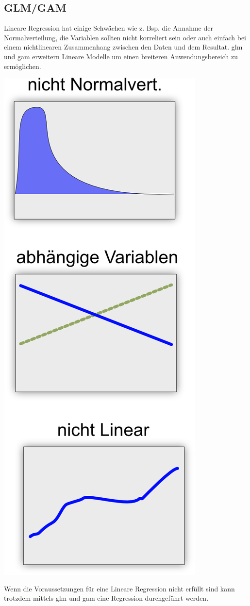 \documentclass[
  12pt, %
  a4paper, %
  oneside, %
  openany, 
  numbers=noenddot, %
  BCOR=5mm, %
  parskip=half*, %
  thesis, %
]{bfhbook}
\begin{document}
\subsection{GLM/GAM}
\label{gam}
Lineare Regression hat einige Schwächen wie z. Bsp. die Annahme der Normalverteilung, die Variablen sollten nicht korreliert sein oder auch einfach bei einem nichtlinearen Zusammenhang zwischen den Daten und dem Resultat. \acrfull{glm} und \acrfull{gam} erweitern Lineare Modelle um einen breiteren Anwendungsbereich zu ermöglichen.
\begin{center}
\begin{minipage}[t]{0.3\linewidth}
\vspace{0pt}
\includegraphics[width=0.6\linewidth]{Bilder/Regressions-Auschluss-Bedingungen.png}
\end{minipage}\hfill
\begin{minipage}[t]{0.55\linewidth}
\vspace{0pt}
Wenn die Voraussetzungen für eine Lineare Regression nicht erfüllt sind kann trotzdem mittels \Gls{glm} und \Gls{gam} eine Regression durchgeführt werden.


\end{minipage}
\end{center}
\end{document}
